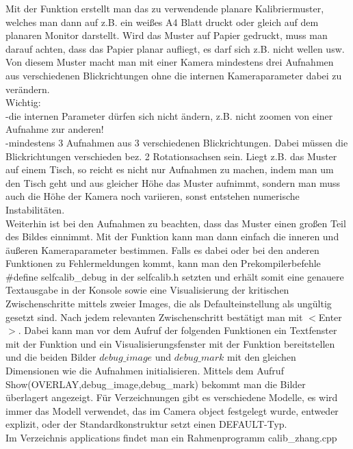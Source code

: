 Mit der Funktion  erstellt man das zu verwendende planare
Kalibriermuster, welches man dann auf z.B. ein weißes A4 Blatt druckt oder
gleich auf dem planaren Monitor darstellt. Wird das Muster auf Papier
gedruckt, muss man darauf achten, dass das Papier planar aufliegt, es darf sich
z.B. nicht wellen usw. Von diesem Muster macht man mit einer Kamera
mindestens drei Aufnahmen aus verschiedenen Blickrichtungen ohne die internen
Kameraparameter dabei zu verändern.\\
Wichtig:\\
-die internen Parameter dürfen sich nicht ändern, z.B. nicht zoomen von
einer Aufnahme zur anderen!\\
-mindestens 3 Aufnahmen aus 3 verschiedenen Blickrichtungen. Dabei müssen
die Blickrichtungen verschieden bez. 2 Rotationsachsen sein. Liegt z.B. das
Muster auf einem Tisch, so reicht es nicht nur Aufnahmen zu machen, indem man
um den Tisch geht und aus gleicher Höhe das Muster aufnimmt, sondern man muss
auch die Höhe der Kamera noch variieren, sonst entstehen numerische Instabilitäten.\\
 Weiterhin ist bei den Aufnahmen zu beachten, dass das Muster einen großen
Teil des Bildes einnimmt. Mit der Funktion  kann man dann
einfach die inneren und äußeren Kameraparameter bestimmen. Falls es
dabei oder bei den anderen Funktionen zu Fehlermeldungen kommt, kann man den
Prekompilerbefehle \#define selfcalib\_debug in der selfcalib.h setzten und
erhält somit eine genauere Textausgabe in der Konsole sowie eine
Visualisierung der kritischen Zwischenschritte mittels zweier Images, die als
Defaulteinstellung als ungültig gesetzt sind. Nach jedem relevanten
Zwischenschritt bestätigt man mit $<$Enter$>$. Dabei kann man vor dem
Aufruf der folgenden Funktionen ein Textfenster mit der Funktion
 und ein Visualisierungsfenster mit der Funktion 
bereitstellen und die beiden Bilder $debug\_image$ und $debug\_mark$ mit den
gleichen Dimensionen wie die Aufnahmen initialisieren. Mittels dem Aufruf
Show(OVERLAY,debug\_image,debug\_mark) bekommt man die Bilder überlagert
angezeigt. Für Verzeichnungen gibt es verschiedene Modelle, es wird immer
das Modell verwendet, das im Camera object festgelegt wurde, entweder
explizit, oder der Standardkonstruktur setzt einen DEFAULT-Typ.
\\
Im Verzeichnis applications findet man ein Rahmenprogramm
calib\_zhang.cpp
\\


